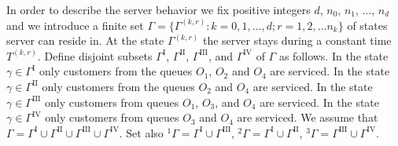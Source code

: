 \documentclass[runningheads,a4paper]{llncs}
\begin{document}
In order to describe the server behavior we fix positive integers $d$, $n_0$, $n_1$, $\ldots$,
$n_d$ and we introduce a finite set $\Gamma=\{\Gamma^{(k,r)} \colon k=0,1,\ldots,d; r=1,2,\ldots
n_k\}$ of states server can reside in. At the state $\Gamma^{(k,r)}$ the server stays during a constant 
time $T^{(k,r)}$. Define disjoint subsets $\Gamma^{\mathrm{I}}$, $\Gamma^{\mathrm{II}}$,
$\Gamma^{\mathrm{III}}$, and $\Gamma^{\mathrm{IV}}$ of $\Gamma$ as follows.  In the state $\gamma
\in \Gamma^{\mathrm{I}}$ only customers from the queues $O_1$, $O_2$ and $O_4$ are serviced.  In the
state $\gamma \in \Gamma^{\mathrm{II}}$ only customers from the queues $O_2$ and $O_4$ are serviced.
In the state $\gamma \in \Gamma^{\mathrm{III}}$ only customers from queues $O_1$, $O_3$, and $O_4$
are serviced.  In the state $\gamma \in \Gamma^{\mathrm{IV}}$ only customers from queues $O_3$ and
$O_4$ are serviced.  We assume that $\Gamma = \Gamma^{\mathrm{I}} \cup \Gamma^{\mathrm{II}} \cup
\Gamma^{\mathrm{III}} \cup \Gamma^{\mathrm{IV}}$. Set also ${}^1\Gamma=\Gamma^{\mathrm{I}} \cup
\Gamma^{\mathrm{III}}$, ${}^2\Gamma=\Gamma^{\mathrm{I}} \cup \Gamma^{\mathrm{II}}$,
${}^3\Gamma=\Gamma^{\mathrm{III}} \cup \Gamma^{\mathrm{IV}}$.
\end{document}
